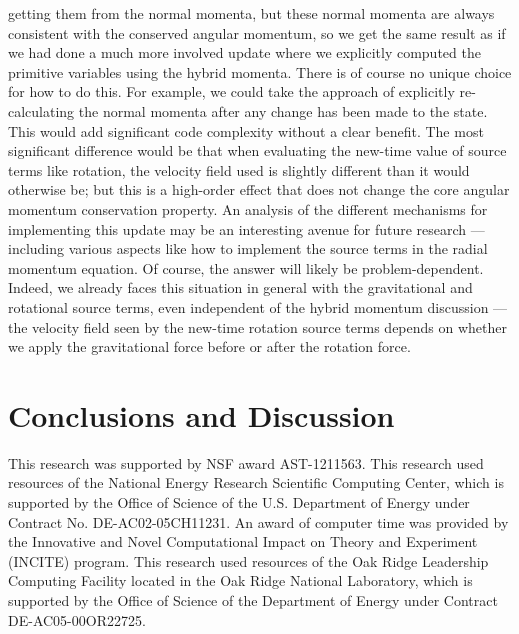 \documentclass[twocolumn,numberedappendix]{../aastex6}
\begin{document}
getting them from the normal momenta, but these normal momenta are always consistent
with the conserved angular momentum, so we get the same result as if we had done
a much more involved update where we explicitly computed the primitive variables
using the hybrid momenta. There is of course no unique choice for how to do this.
For example, we could take the approach of explicitly re-calculating the normal
momenta after any change has been made to the state. This would add significant code
complexity without a clear benefit. The most significant difference would be
that when evaluating the new-time value of source terms like rotation, the velocity
field used is slightly different than it would otherwise be; but this is a high-order
effect that does not change the core angular momentum conservation property. An
analysis of the different mechanisms for implementing this update may be an interesting
avenue for future research --- including various aspects like how to implement the
source terms in the radial momentum equation. Of course, the answer will likely
be problem-dependent. Indeed, we already faces this situation in general with the
gravitational and rotational source terms, even independent of the hybrid momentum
discussion --- the velocity field seen by the new-time rotation source terms depends
on whether we apply the gravitational force before or after the rotation force.



\section{Conclusions and Discussion}\label{Sec:Conclusions and Discussion}


\acknowledgments

This research was supported by NSF award AST-1211563.  This research
used resources of the National Energy Research Scientific Computing
Center, which is supported by the Office of Science of the
U.S. Department of Energy under Contract No. DE-AC02-05CH11231.  An
award of computer time was provided by the Innovative and Novel
Computational Impact on Theory and Experiment (INCITE) program.  This
research used resources of the Oak Ridge Leadership Computing Facility
located in the Oak Ridge National Laboratory, which is supported by
the Office of Science of the Department of Energy under Contract
DE-AC05-00OR22725.

\clearpage





\clearpage
\appendix
\end{document}
